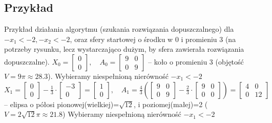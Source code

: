 \documentclass[licencjacka]{pracamgr}
\begin{document}
   \subsection{Przykład}
Przykład działania algorytmu (szukania rozwiązania dopuszczalnego) dla $-x_1<-2,-x_2<-2$, oraz sfery startowej o środku w 0 i promieniu 3
(na potrzeby rysunku, lecz wystarczająco dużym, by sfera zawierała rozwiązania dopuszczalne).\newline\newline
%
$X_0=\left[\begin{array}{c}0\\0\end{array}\right],\quad A_0=\left[\begin{array}{cc}9&0\\0&9\end{array}\right]$ -- koło o promieniu 3 (objętość $V=9\pi\approx28.3$).\newline\newline
%
Wybieramy niespełnioną nierówność $-x_1<-2$\newline\newline
$X_1=\left[\begin{array}{c}0\\0\end{array}\right]-\frac{1}{3}\cdot\left[\begin{array}{c}-3\\0\end{array}\right]=\left[\begin{array}{c}1\\0\end{array}\right],\quad
A_1=\frac{4}{3}\left(\left[\begin{array}{cc}9&0\\0&9\end{array}\right]-\frac{2}{3}\cdot\left[\begin{array}{cc}9&0\\0&0\end{array}\right] \right)=
\left[\begin{array}{cc}4&0\\0&12\end{array}\right]$\newline\newline
-- elipsa o półosi pionowej(wielkiej)=$\sqrt{12}$, i poziomej(małej)=2 ($V=2\sqrt{12}\pi\approx21.8$)\newline
%
Wybieramy niespełnioną nierówność $-x_1<-2$\newline\newline
\end{document}
